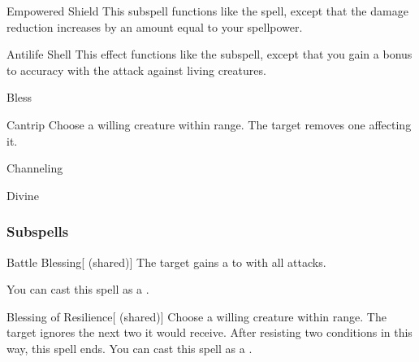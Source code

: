\begin{ability}[\nth{5}]{Empowered Shield}
This subspell functions like the  spell, except that the damage reduction increases by an amount equal to your spellpower.
\end{ability}
\vspace{0.25em}


\begin{ability}[\nth{7}]{Antilife Shell}
This effect functions like the  subspell, except that you gain a  bonus to accuracy with the attack against living creatures.
\end{ability}
\vspace{0.25em}

\newpage
\begin{spellsection}{Bless}

\begin{spellheader}
\end{spellheader}


\begin{ability}{Cantrip}
Choose a willing creature within \rngclose range.
The target removes one  affecting it.
\end{ability}




 Channeling

 Divine
\end{spellsection}


\subsubsection{Subspells}


\begin{ability}[\nth{1}]{Battle Blessing}[ (shared)]
The target gains a   to  with all attacks.

You can cast this spell as a .
\end{ability}
\vspace{0.25em}


\begin{ability}[\nth{1}]{Blessing of Resilience}[ (shared)]
Choose a willing creature within \rngclose range.
The target ignores the next two  it would receive.
After resisting two conditions in this way, this spell ends.
You can cast this spell as a .
\end{ability}
\vspace{0.25em}


